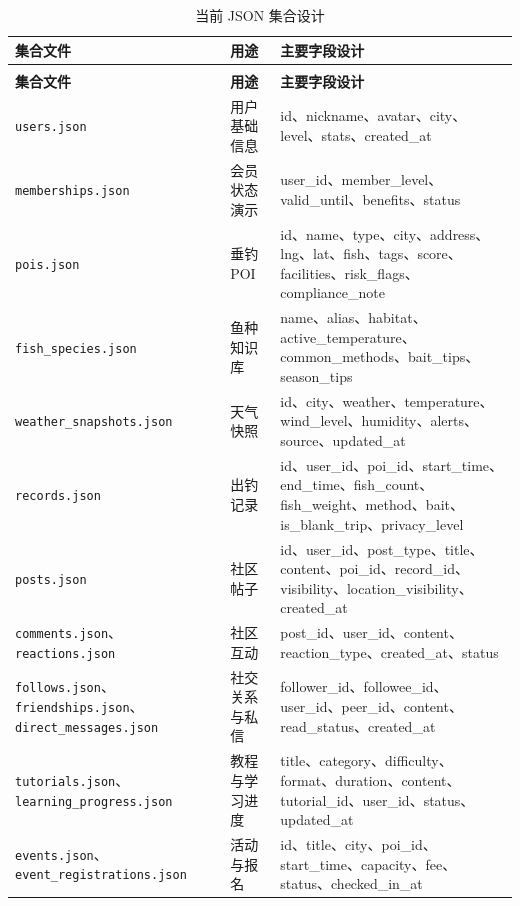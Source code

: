 {\small
\begin{longtable}{|>{\raggedright\arraybackslash}p{3.8cm}|>{\raggedright\arraybackslash}p{3.0cm}|>{\raggedright\arraybackslash}p{6.8cm}|}
  \caption{当前 JSON 集合设计}
  \label{tab:json-collections}\\
  \toprule
  \textbf{集合文件} & \textbf{用途} & \textbf{主要字段设计} \\
  \midrule
  \endfirsthead
  \multicolumn{3}{c}{\tablename~\thetable\quad（续）}\\
  \toprule
  \textbf{集合文件} & \textbf{用途} & \textbf{主要字段设计} \\
  \midrule
  \endhead
  \bottomrule
  \endlastfoot
  \texttt{users.json} & 用户基础信息 & id、nickname、avatar、city、level、stats、created\_at \\
  \hline
  \texttt{memberships.json} & 会员状态演示 & user\_id、member\_level、valid\_until、benefits、status \\
  \hline
  \texttt{pois.json} & 垂钓 POI & id、name、type、city、address、lng、lat、fish、tags、score、facilities、risk\_flags、compliance\_note \\
  \hline
  \texttt{fish\_species.json} & 鱼种知识库 & name、alias、habitat、active\_temperature、common\_methods、bait\_tips、season\_tips \\
  \hline
  \texttt{weather\_snapshots.json} & 天气快照 & id、city、weather、temperature、wind\_level、humidity、alerts、source、updated\_at \\
  \hline
  \texttt{records.json} & 出钓记录 & id、user\_id、poi\_id、start\_time、end\_time、fish\_count、fish\_weight、method、bait、is\_blank\_trip、privacy\_level \\
  \hline
  \texttt{posts.json} & 社区帖子 & id、user\_id、post\_type、title、content、poi\_id、record\_id、visibility、location\_visibility、created\_at \\
  \hline
  \texttt{comments.json}、\texttt{reactions.json} & 社区互动 & post\_id、user\_id、content、reaction\_type、created\_at、status \\
  \hline
  \texttt{follows.json}、\texttt{friendships.json}、\texttt{direct\_messages.json} & 社交关系与私信 & follower\_id、followee\_id、user\_id、peer\_id、content、read\_status、created\_at \\
  \hline
  \texttt{tutorials.json}、\texttt{learning\_progress.json} & 教程与学习进度 & title、category、difficulty、format、duration、content、tutorial\_id、user\_id、status、updated\_at \\
  \hline
  \texttt{events.json}、\texttt{event\_registrations.json} & 活动与报名 & id、title、city、poi\_id、start\_time、capacity、fee、status、checked\_in\_at \\

\end{longtable}}
